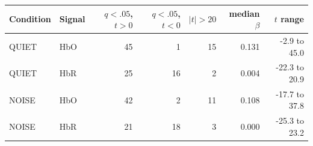 \begin{tabular}{llrrrrr}
\toprule
Condition & Signal & $q<.05$, $t>0$ & $q<.05$, $t<0$ & $|t|>20$ & median $\beta$ & $t$ range \\
\midrule
QUIET & HbO & 45 & 1 & 15 & 0.131 & -2.9 to 45.0 \\
QUIET & HbR & 25 & 16 & 2 & 0.004 & -22.3 to 20.9 \\
NOISE & HbO & 42 & 2 & 11 & 0.108 & -17.7 to 37.8 \\
NOISE & HbR & 21 & 18 & 3 & 0.000 & -25.3 to 23.2 \\
\bottomrule
\end{tabular}
